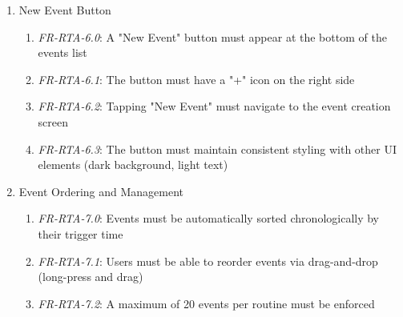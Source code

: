 \documentclass[conference]{IEEEtran}
\begin{document}
\begin{enumerate}
\begin{enumerate}
                            \item \textit{FR-RTA-5.2}: Event cards must display the event name (e.g., "Untitled Event 65011")
                            \item \textit{FR-RTA-5.3}: The second line must show the action state (ON/OFF), time in 24-hour format, and action type (e.g., "Set Scene")
                            \item \textit{FR-RTA-5.4}: Format must be: "[STATE], [TIME], [ACTION]" (e.g., "ON, 18:00, Set Scene")
                            \item \textit{FR-RTA-5.5}: A chevron (>) must appear on the right side of each card to indicate it's tappable
                            \item \textit{FR-RTA-5.6}: Tapping an event card must navigate to the event detail/edit screen
                            \item \textit{FR-RTA-5.7}: Event cards must support swipe gestures for quick delete actions
                        \end{enumerate}
                    \item New Event Button
                        \begin{enumerate}
                            \item \textit{FR-RTA-6.0}: A "New Event" button must appear at the bottom of the events list
                            \item \textit{FR-RTA-6.1}: The button must have a "+" icon on the right side
                            \item \textit{FR-RTA-6.2}: Tapping "New Event" must navigate to the event creation screen
                            \item \textit{FR-RTA-6.3}: The button must maintain consistent styling with other UI elements (dark background, light text)
                        \end{enumerate}
                    \item Event Ordering and Management
                        \begin{enumerate}
                            \item \textit{FR-RTA-7.0}: Events must be automatically sorted chronologically by their trigger time
                            \item \textit{FR-RTA-7.1}: Users must be able to reorder events via drag-and-drop (long-press and drag)
                            \item \textit{FR-RTA-7.2}: A maximum of 20 events per routine must be enforced

\end{enumerate}
\end{enumerate}
\end{document}
